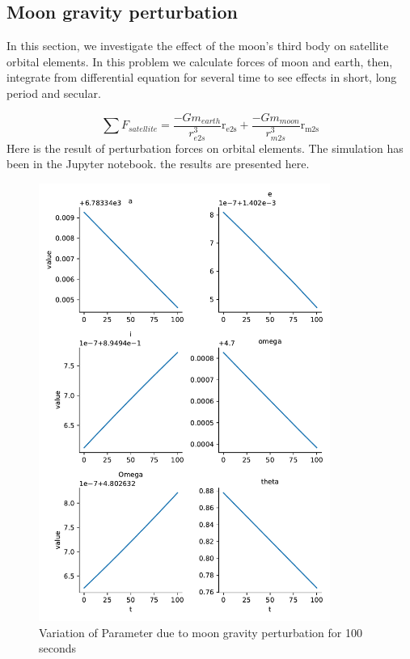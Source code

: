 \subsection{Moon gravity perturbation}
In this section, we investigate the effect of the moon's third body on satellite orbital elements. In this problem we calculate forces of moon and earth, then, integrate from differential equation for several time to see effects in short, long period and secular.

$$
\sum F_{satellite} = \dfrac{-Gm_{earth}}{r_{e2s}^3} \boldsymbol{\mathrm{r_{e2s}}} + \dfrac{-Gm_{moon}}{r_{m2s}^3} \boldsymbol{\mathrm{r_{m2s}}}
$$
Here is the result of perturbation forces on
orbital elements. The simulation has been in the Jupyter notebook. the results are presented here.

\begin{figure}[H]
    \centering
    \includegraphics[width=0.85\textwidth]{../Figure/Q2/orbital_elements_variation_moon_100}
    \caption{Variation of Parameter due to moon gravity perturbation for 100 seconds}
\end{figure}


